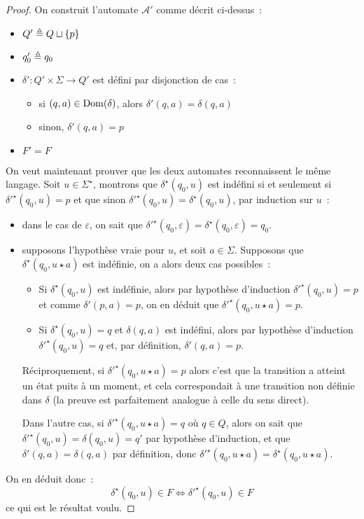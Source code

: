 \begin{proof}
  On construit l'automate $\mathcal A'$ comme décrit ci-dessus~:
  \begin{itemize}
  \item $Q' \triangleq Q \sqcup \{p\}$
  \item $q'_0 \triangleq q_0$
  \item $\delta' : Q' \times \Sigma \to Q'$ est défini par disjonction de cas~:
    \begin{itemize}
    \item si $(q,a) \in \operatorname{Dom}(\delta)$, alors $\delta'(q,a) = \delta(q,a)$
    \item sinon, $\delta'(q,a) = p$
    \end{itemize}
  \item $F' = F$
  \end{itemize}

  On veut maintenant prouver que les deux automates reconnaissent le même
  langage. Soit $u \in \Sigma^\star$, montrons que $\delta^\star(q_0,u)$ est
  indéfini si et seulement si $\delta'^\star(q_0,u) = p$ et que sinon
  $\delta'^\star(q_0,u) = \delta^\star(q_0,u)$, par induction sur $u$~:
  \begin{itemize}
  \item dans le cas de $\varepsilon$, on sait que
    $\delta'^\star(q_0,\varepsilon) = \delta^\star(q_0,\varepsilon) = q_0$.
  \item supposons l'hypothèse vraie pour $u$, et soit $a \in \Sigma$. Supposons
    que $\delta^\star(q_0,u\star a)$ est indéfinie, on a alors deux cas
    possibles~:
    \begin{itemize}
    \item Si $\delta^\star(q_0,u)$ est indéfinie, alors par hypothèse
      d'induction $\delta'^\star(q_0,u) = p$ et comme $\delta'(p,a) = p$, on en
      déduit que $\delta'^\star(q_0,u\star a) = p$.
    \item Si $\delta^\star(q_0,u) = q$ et $\delta(q,a)$ est indéfini, alors
      par hypothèse d'induction $\delta'^\star(q_0,u) = q$ et, par définition,
      $\delta'(q,a) = p$.
    \end{itemize}
    
    Réciproquement, si $\delta'^\star(q_0,u\star a) = p$ alors c'est que la
    transition a atteint un état puits à un moment, et cela correspondait à
    une transition non définie dans $\delta$ (la preuve est parfaitement
    analogue à celle du sens direct).

    Dans l'autre cas, si $\delta'^\star(q_0,u\star a) = q$ où $q \in Q$, alors
    on sait que $\delta'^\star(q_0,u) = \delta(q_0,u) = q'$ par hypothèse
    d'induction, et que $\delta'(q,a) = \delta(q,a)$ par définition,
    donc $\delta'^\star(q_0,u\star a) = \delta^\star(q_0,u\star a)$.
  \end{itemize}

  On en déduit donc~:
  \[\delta^\star(q_0,u) \in F \iff \delta'^\star(q_0,u)\in F\]
  ce qui est le résultat voulu.
\end{proof}

